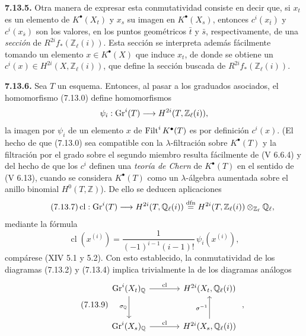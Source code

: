 \textbf{7.13.5.} Otra manera de expresar esta conmutatividad consiste en decir que, si \(x_t\) es un elemento de \(K^\bullet(X_t)\) y \(x_s\) su imagen en \(K^\bullet(X_s)\), entonces \(c^i(x_{\bar t})\) y \(c^i(x_{\bar s})\) son los valores, en los puntos geométricos \(\bar t\) y \(\bar s\), respectivamente, de una \emph{sección} de \(R^{2i}f_*(\mathbb Z_\ell(i))\). Esta sección se interpreta además fácilmente tomando un elemento \(x\in K^\bullet(X)\) que induce \(x_t\), de donde se obtiene un \(c^i(x)\in H^{2i}(X,\mathbb Z_\ell(i))\), que define la sección buscada de \(R^{2i}f_*(\mathbb Z_\ell(i))\).

\textbf{7.13.6.} Sea \(T\) un esquema. Entonces, al pasar a los graduados asociados, el homomorfismo (7.13.0) define homomorfismos
\[
  \psi_i:\operatorname{Gr}^i(T)\longrightarrow H^{2i}(T,\mathbb Z_\ell(i)),
\]
la imagen por \(\psi_i\) de un elemento \(x\) de \(\operatorname{Filt}^iK^\bullet(T)\) es por definición \(c^i(x)\). (El hecho de que (7.13.0) sea compatible con la \(\lambda\)-filtración sobre \(K^\bullet(T)\) y la filtración por el grado sobre el segundo miembro resulta fácilmente de (V 6.6.4) y del hecho de que los \(c^i\) definen una \emph{teoría de Chern} de \(K^\bullet(T)\) en el sentido de (V 6.13), cuando se considera \(K^\bullet(T)\) como un \(\lambda\)-álgebra aumentada sobre el anillo binomial \(H^0(T,\mathbb Z)\)). De ello se deducen aplicaciones
\begin{equation}\tag{7.13.7}
  \operatorname{cl}:\operatorname{Gr}^i(T)\longrightarrow H^{2i}(T,\mathbb Q_\ell(i))
  \stackrel{\mathrm{dfn}}{=}
  H^{2i}(T,\mathbb Z_\ell(i))\otimes_{\mathbb Z_\ell}\mathbb Q_\ell,
\end{equation}
mediante la fórmula
\begin{equation}\tag{7.13.8}
  \operatorname{cl}(x^{(i)})=
  \frac{1}{(-1)^{i-1}(i-1)!}\,\psi_i(x^{(i)}),
\end{equation}
compárese (XIV 5.1 y 5.2). Con esto establecido, la conmutatividad de los diagramas (7.13.2) y (7.13.4) implica trivialmente la de los diagramas análogos
\begin{equation}\tag{7.13.9}
\begin{tikzcd}[column sep=large,row sep=large]
\Gr^i(X_t)_{\mathbb Q} \arrow[r,"\operatorname{cl}"] \arrow[d,"\sigma_{\mathbb Q}"'] &
H^{2i}(X_t,\mathbb Q_\ell(i))\\
\Gr^i(X_s)_{\mathbb Q} \arrow[r,"\operatorname{cl}"] &
H^{2i}(X_s,\mathbb Q_\ell(i)) \arrow[u,"\sigma^{-1}"]
\end{tikzcd}
\;,
\end{equation}
